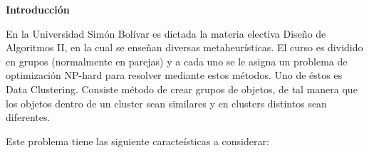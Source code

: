 
\begin{center}
	{\bf Introducci\'on} \label{chap:intro}
\end{center}


\label{sect:motivacion}
\vspace{5 mm}

En la Universidad Sim\'on Bol\'ivar es dictada la materia electiva
Dise\~no de Algoritmos II, en la cual se enseñan diversas metaheur\'isticas.
El curso es dividido en grupos (normalmente en parejas) y a cada uno se le asigna un problema 
de optimizaci\'on NP-hard para resolver mediante estos m\'etodos. Uno de \'estos es Data Clustering.
Consiste m\'etodo de crear grupos de objetos,
de tal manera que los objetos dentro de un cluster sean similares y 
en clusters distintos sean diferentes. \cite{GaChJi2007}

Este problema tiene las siguiente caracte\'isticas a considerar: \cite{SwAjAm2009}


